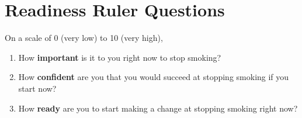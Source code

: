 \chapter{Readiness Ruler Questions}
\begin{tcolorbox}[floatplacement=pthb!,
                  fonttitle=\bfseries,
                  fontupper=\small] 

\label{appendix:readiness_rulers}

On a scale of 0 (very low) to 10 (very high),
\begin{enumerate}[itemsep=0pt]
    \item How \textbf{important} is it to you right now to stop smoking?
    \item How \textbf{confident} are you that you would succeed at stopping smoking if you start now?
    \item How \textbf{ready} are you to start making a change at stopping smoking right now?
\end{enumerate}

\end{tcolorbox}